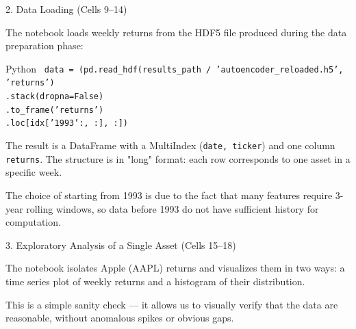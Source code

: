 \documentclass[aspectratio=169, 11pt]{beamer}
\begin{document}
%
%
\begin{frame}{2. Data Loading (Cells 9--14)}

The notebook loads weekly returns from the HDF5 file produced during the data preparation phase:

\vspace{0.3cm}

\begin{block}{Python}
\small
\texttt{
data = (pd.read\_hdf(results\_path / 'autoencoder\_reloaded.h5', 'returns') \\
\hspace{0.8cm} .stack(dropna=False) \\
\hspace{0.8cm} .to\_frame('returns') \\
\hspace{0.8cm} .loc[idx['1993':, :], :])
}
\end{block}

\vspace{0.3cm}

The result is a DataFrame with a MultiIndex (\texttt{date, ticker}) and one column \texttt{returns}.  
The structure is in "long" format: each row corresponds to one asset in a specific week.

\vspace{0.3cm}

The choice of starting from 1993 is due to the fact that many features require 3-year rolling windows, so data before 1993 do not have sufficient history for computation.

\end{frame}
%
%
\begin{frame}{3. Exploratory Analysis of a Single Asset (Cells 15--18)}

The notebook isolates Apple (AAPL) returns and visualizes them in two ways: a time series plot of weekly returns and a histogram of their distribution.

\vspace{0.3cm}

This is a simple sanity check — it allows us to visually verify that the data are reasonable, without anomalous spikes or obvious gaps.

\end{frame}
%
%
\end{document}
